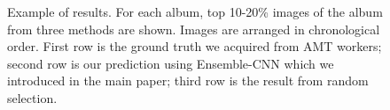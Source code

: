 \documentclass[10pt,twocolumn,letterpaper]{article}
\begin{document}
\begin{figure}[ht]
           \caption{Example of results. For each album, top 10-20\% images of the album from three methods are shown. Images are arranged in chronological order. First row is the ground truth we acquired from AMT workers; second row is our prediction using Ensemble-CNN which we introduced in the main paper; third row is the result from random selection.}
         \end{figure}

  
{\small


}
\end{document}
